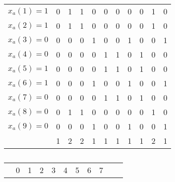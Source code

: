\documentclass[conference]{IEEEtran}
\begin{document}
\begin{table*}
\begin{subtable}[b]{0.45\linewidth}
\begin{tabular}{c|c|c|c|c|c|c|c|c|c|c|}
	{\color{red} $x_{a}(1)=1$} & {\color{red} 0} & {\color{red} 1} & {\color{red} 1} & {\color{red} 0} & {\color{red} 0} & {\color{red} 0} & {\color{red} 0} & {\color{red} 0} & {\color{red} 1} & {\color{red} 0} \\ \cline{2-11}
	{\color{red} $x_{a}(2)=1$} & {\color{red} 0} & {\color{red} 1} & {\color{red} 1} & {\color{red} 0} & {\color{red} 0} & {\color{red} 0} & {\color{red} 0} & {\color{red} 0} & {\color{red} 1} & {\color{red} 0} \\ \cline{2-11}
	$x_{a}(3)=0$ & 0 & 0 & 0 & 1 & 0 & 0 & 1 & 0 & 0 & 1 \\ \cline{2-11}
	$x_{a}(4)=0$ & 0 & 0 & 0 & 0 & 1 & 1 & 0 & 1 & 0 & 0 \\ \cline{2-11}
	{\color{red} $x_{a}(5)=1$} & {\color{red} 0} & {\color{red} 0} & {\color{red} 0} & {\color{red} 0} & {\color{red} 1} & {\color{red} 1} & {\color{red} 0} & {\color{red} 1} & {\color{red} 0} & {\color{red} 0} \\ \cline{2-11}
	{\color{red} $x_{a}(6)=1$} & {\color{red} 0} & {\color{red} 0} & {\color{red} 0} & {\color{red} 1} & {\color{red} 0} & {\color{red} 0} & {\color{red} 1} & {\color{red} 0} & {\color{red} 0} & {\color{red} 1} \\ \cline{2-11}
	$x_{a}(7)=0$ & 0 & 0 & 0 & 0 & 1 & 1 & 0 & 1 & 0 & 0 \\ \cline{2-11}
	$x_{a}(8)=0$ & 0 & 1 & 1 & 0 & 0 & 0 & 0 & 0 & 1 & 0 \\ \cline{2-11}
	$x_{a}(9)=0$ & 0 & 0 & 0 & 1 & 0 & 0 & 1 & 0 & 0 & 1 \\ \cline{2-11}
	\multicolumn{1}{c}{} & \multicolumn{1}{c}{{\color{blue}1}} & \multicolumn{1}{c}{{\color{blue}2}} & \multicolumn{1}{c}{{\color{blue}2}} & \multicolumn{1}{c}{{\color{blue}1}} & \multicolumn{1}{c}{{\color{blue}1}} & \multicolumn{1}{c}{{\color{blue}1}} & \multicolumn{1}{c}{{\color{blue}1}} & \multicolumn{1}{c}{{\color{blue}1}} & \multicolumn{1}{c}{{\color{blue}2}} & \multicolumn{1}{c}{{\color{blue}1}} \\
	\end{tabular}	
	\caption{}
	\label{table:mat2}
\end{subtable}
\hspace{2em}
\begin{subtable}[b]{0.45\linewidth}
	\begin{tabular}{c|c|c|c|c|c|c|c|c|c|c|}
	\multicolumn{1}{c}{}  &  \multicolumn{1}{c}{0} & \multicolumn{1}{c}{1} & 
	\multicolumn{1}{c}{2} &  \multicolumn{1}{c}{3} & \multicolumn{1}{c}{4} & 
	\multicolumn{1}{c}{5} &  \multicolumn{1}{c}{6} & \multicolumn{1}{c}{7} & 

\end{tabular}
\end{subtable}
\end{table*}
\end{document}
